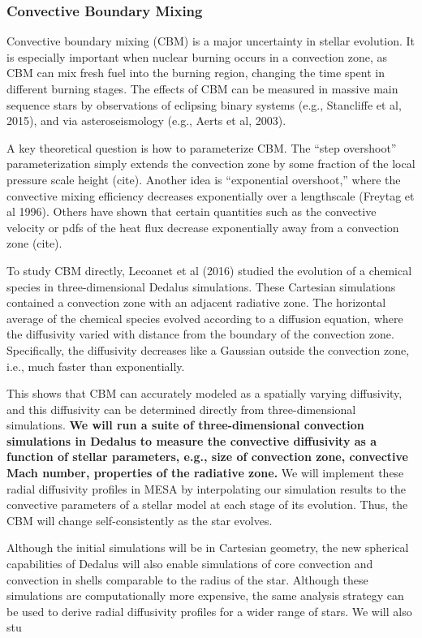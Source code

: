 {\color{purple}
\subsubsection{Convective Boundary Mixing}
}

Convective boundary mixing (CBM) is a major uncertainty in stellar evolution. It is especially important when nuclear burning occurs in a convection zone, as CBM can mix fresh fuel into the burning region, changing the time spent in different burning stages. The effects of CBM can be measured in massive main sequence stars by observations of eclipsing binary systems (e.g., Stancliffe et al, 2015), and via asteroseismology (e.g., Aerts et al, 2003).

A key theoretical question is how to parameterize CBM. The ``step overshoot'' parameterization simply extends the convection zone by some fraction of the local pressure scale height (cite). Another idea is ``exponential overshoot,'' where the convective mixing efficiency decreases exponentially over a lengthscale (Freytag et al 1996). Others have shown that certain quantities such as the convective velocity or pdfs of the heat flux decrease exponentially away from a convection zone (cite).

To study CBM directly, Lecoanet et al (2016) studied the evolution of a chemical species in three-dimensional Dedalus simulations.  These Cartesian simulations contained a convection zone with an adjacent radiative zone. The horizontal average of the chemical species evolved according to a diffusion equation, where the diffusivity varied with distance from the boundary of the convection zone. Specifically, the diffusivity decreases like a Gaussian outside the convection zone, i.e., much faster than exponentially.

This shows that CBM can accurately modeled as a spatially varying diffusivity, and this diffusivity can be determined directly from three-dimensional simulations. \textbf{We will run a suite of three-dimensional convection simulations in Dedalus to measure the convective diffusivity as a function of stellar parameters, e.g., size of convection zone, convective Mach number, properties of the radiative zone.} We will implement these radial diffusivity profiles in MESA by interpolating our simulation results to the convective parameters of a stellar model at each stage of its evolution. Thus, the CBM will change self-consistently as the star evolves.

Although the initial simulations will be in Cartesian geometry, the new spherical capabilities of Dedalus will also enable simulations of core convection and convection in shells comparable to the radius of the star. Although these simulations are computationally more expensive, the same analysis strategy can be used to derive radial diffusivity profiles for a wider range of stars. We will also stu
